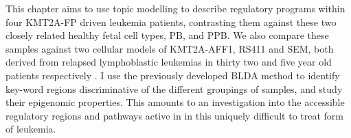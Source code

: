 This chapter aims to use topic modelling to describe regulatory programs within four KMT2A-FP driven leukemia patients, contrasting them against these two closely related healthy fetal cell types, PB, and PPB. We also compare these samples against two cellular models of KMT2A-AFF1, RS411 and SEM, both derived from relapsed lymphoblastic leukemias in thirty two and five year old patients respectively \cite{Ragusa2019}.  I use the previously developed BLDA method to identify key-word regions discriminative of the different groupings of samples, and study their epigenomic properties. This amounts to an investigation into the accessible regulatory regions and pathways active in in this uniquely difficult to treat form of leukemia. 











